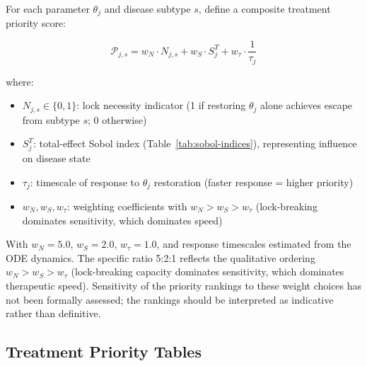 For each parameter $\theta_j$ and disease subtype $s$, define a composite treatment priority score:

\begin{equation}
\label{eq:priority-score}
\mathcal{P}_{j,s} = w_N \cdot N_{j,s} + w_S \cdot S_j^T + w_\tau \cdot \frac{1}{\tau_j}
\end{equation}

where:
\begin{itemize}
    \item $N_{j,s} \in \{0, 1\}$: lock necessity indicator (1 if restoring $\theta_j$ alone achieves escape from subtype $s$; 0 otherwise)
    \item $S_j^T$: total-effect Sobol index (Table~\ref{tab:sobol-indices}), representing influence on disease state
    \item $\tau_j$: timescale of response to $\theta_j$ restoration (faster response = higher priority)
    \item $w_N, w_S, w_\tau$: weighting coefficients with $w_N > w_S > w_\tau$ (lock-breaking dominates sensitivity, which dominates speed)
\end{itemize}

With $w_N = 5.0$, $w_S = 2.0$, $w_\tau = 1.0$, and response timescales estimated from the ODE dynamics. The specific ratio 5:2:1 reflects the qualitative ordering $w_N > w_S > w_\tau$ (lock-breaking capacity dominates sensitivity, which dominates therapeutic speed). Sensitivity of the priority rankings to these weight choices has not been formally assessed; the rankings should be interpreted as indicative rather than definitive.

\subsection{Treatment Priority Tables}

